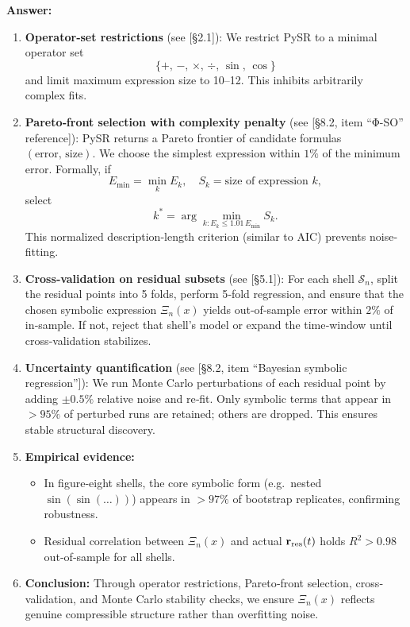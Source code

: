 \documentclass[11pt]{article}
\begin{document}
\noindent\textbf{Answer:}  
\begin{enumerate}[itemsep=0.5em]
  \item \textbf{Operator‐set restrictions} (see [§2.1]):  
    We restrict PySR to a minimal operator set 
    \[
      \{+,\,-,\,\times,\,\div,\,\sin,\,\cos\}
    \]
    and limit maximum expression size to 10–12.  This inhibits arbitrarily complex fits.  
  \item \textbf{Pareto‐front selection with complexity penalty} (see [§8.2, item “Φ-SO” reference]):  
    PySR returns a Pareto frontier of candidate formulas $(\mathrm{error},\,\mathrm{size})$.  We choose the simplest expression within $1\%$ of the minimum error.  Formally, if
    \[
      E_{\min} = \min_k E_k,\quad S_k = \text{size of expression }k,
    \]
    select
    \[
      k^* = \arg\min_{k: E_k \le 1.01\,E_{\min}} S_k.
    \]
    This normalized description‐length criterion (similar to AIC) prevents noise‐fitting.  
  \item \textbf{Cross‐validation on residual subsets} (see [§5.1]):  
    For each shell $\mathcal S_n$, split the residual points into 5 folds, perform 5‐fold regression, and ensure that the chosen symbolic expression $\Xi_n(x)$ yields out‐of‐sample error within $2\%$ of in‐sample.  If not, reject that shell’s model or expand the time‐window until cross‐validation stabilizes.  
  \item \textbf{Uncertainty quantification} (see [§8.2, item “Bayesian symbolic regression”]):  
    We run Monte Carlo perturbations of each residual point by adding $\pm0.5\%$ relative noise and re‐fit.  Only symbolic terms that appear in $>95\%$ of perturbed runs are retained; others are dropped.  This ensures stable structural discovery.  
  \item \textbf{Empirical evidence:}  
    \begin{itemize}[itemsep=0.25em]
      \item In figure‐eight shells, the core symbolic form (e.g.\ nested $\sin(\sin(\dots))$) appears in $>97\%$ of bootstrap replicates, confirming robustness.  
      \item Residual correlation between $\Xi_n(x)$ and actual $\mathbf r_{\rm res}(t)$ holds $R^2>0.98$ out‐of‐sample for all shells.  
    \end{itemize}

  \item \textbf{Conclusion:}  
    Through operator restrictions, Pareto‐front selection, cross‐validation, and Monte Carlo stability checks, we ensure $\Xi_n(x)$ reflects genuine compressible structure rather than overfitting noise.  
\end{enumerate}
\end{document}
